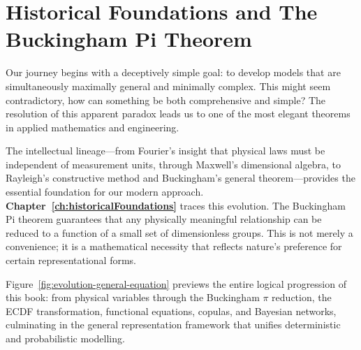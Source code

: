 \section{Historical Foundations and The Buckingham Pi Theorem}
Our journey begins with a deceptively simple goal: to develop models that are simultaneously maximally general and minimally complex. This might seem contradictory, how can something be both comprehensive and simple? The resolution of this apparent paradox leads us to one of the most elegant theorems in applied mathematics and engineering.

The intellectual lineage—from Fourier's insight that physical laws must be independent of measurement units, through Maxwell's dimensional algebra, to Rayleigh's constructive method and Buckingham's general theorem—provides the essential foundation for our modern approach. \textbf{Chapter~\ref{ch:historicalFoundations}} traces this evolution. The Buckingham Pi theorem guarantees that any physically meaningful relationship can be reduced to a function of a small set of dimensionless groups. This is not merely a convenience; it is a mathematical necessity that reflects nature's preference for certain representational forms.

Figure~\ref{fig:evolution-general-equation} previews the entire logical progression of this book: from physical variables through the Buckingham \(\pi\) reduction, the ECDF transformation, functional equations, copulas, and Bayesian networks, culminating in the general representation framework that unifies deterministic and probabilistic modelling.

